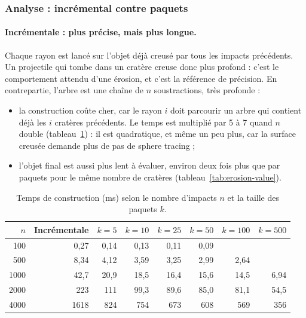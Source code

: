 \documentclass[11pt,a4paper]{article}
\begin{document}
\subsubsection{Analyse : incrémental contre paquets}

\paragraph{Incrémentale : plus précise, mais plus longue.} Chaque rayon est lancé sur l'objet déjà creusé par tous les impacts précédents. Un projectile qui tombe dans un cratère creuse donc plus profond : c'est le comportement attendu d'une érosion, et c'est la référence de précision. En contrepartie, l'arbre est une chaîne de $n$ soustractions, très profonde :
\begin{itemize}
  \item la construction coûte cher, car le rayon $i$ doit parcourir un arbre qui contient déjà les $i$ cratères précédents. Le temps est multiplié par 5 à 7 quand $n$ double (tableau~\ref{tab:erosion-construction}) : il est quadratique, et même un peu plus, car la surface creusée demande plus de pas de sphere tracing ;
  \item l'objet final est aussi plus lent à évaluer, environ deux fois plus que par paquets pour le même nombre de cratères (tableau~\ref{tab:erosion-value}).
\end{itemize}

\begin{table}[H]
  \centering
  \caption{Temps de construction (ms) selon le nombre d'impacts $n$ et la taille des paquets $k$.}
  \label{tab:erosion-construction}
  \small
  \begin{tabular}{rrrrrrrr}
    \toprule
    $n$ & Incrémentale & $k=5$ & $k=10$ & $k=25$ & $k=50$ & $k=100$ & $k=500$ \\
    \midrule
    100  & 0,27 & 0,14 & 0,13 & 0,11 & 0,09 & & \\
    500  & 8,34 & 4,12 & 3,59 & 3,25 & 2,99 & 2,64 & \\
    1000 & 42,7 & 20,9 & 18,5 & 16,4 & 15,6 & 14,5 & 6,94 \\
    2000 & 223  & 111  & 99,3 & 89,6 & 85,0 & 81,1 & 54,5 \\
    4000 & 1618 & 824  & 754  & 673  & 608  & 569  & 356 \\
    \bottomrule
  \end{tabular}
\end{table}
\end{document}
